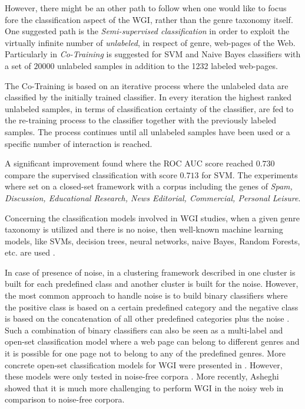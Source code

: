 However, there might be an other path to follow when one would like to focus fore the classification aspect of the WGI, rather than the genre taxonomy itself. One suggested path is the \textit{Semi-supervised classification} in order to exploit the virtually infinite number of \textit{unlabeled}, in respect of genre, web-pages of the Web. Particularly in \parencite{chetry2011web}\textit{ Co-Training} is suggested for SVM and Naive Bayes classifiers with a set of $20000$ unlabeled samples in addition to the 1232 labeled web-pages.

The Co-Training is based on an iterative process where the unlabeled data are classified by the initially trained classifier. In every iteration the highest ranked unlabeled samples, in terms of classification certainty of the classifier, are fed to the re-training process to the classifier together with the previously labeled samples. The process continues until all unlabeled samples have been used or a specific number of interaction is reached. 

A significant improvement found where the ROC AUC score reached $0.730$ compare the supervised classification with score $0.713$ for SVM. The experiments where set on a closed-set framework with a corpus including the genes of \textit{Spam, Discussion, Educational Research, News Editorial, Commercial, Personal Leisure}.

Concerning the classification models involved in WGI studies, when a given genre taxonomy is utilized and there is no noise, then well-known machine learning models, like SVMs, decision trees, neural networks, naive Bayes, Random Forests, etc. are used \parencite{Lim2005,santini2007automatic,kanaris2009learning,jebari2015combination,sharoff2010web}. 

In case of presence of  noise, in a clustering framework described in \parencite{kennedy2005automatic} one cluster is built for each predefined class and another cluster is built for the noise. However, the most  common approach to handle noise is to build binary classifiers where the positive class is based on a certain predefined category and the negative class is based on the concatenation of  all other predefined categories plus the noise \parencite{kennedy2005automatic,dong2006binary,levering2008using}. Such a combination of binary classifiers can also be seen as a multi-label and open-set classification model where a web page can belong to different genres and it is possible for one page not to belong to any of the predefined genres. More concrete open-set  classification models for WGI were presented in \parencite{stubbe2007genre,pritsos2013open}. However, these models were only tested in noise-free corpora \parencite{pritsos2015clef}. More  recently, Asheghi \parencite{Asheghi2015} showed that it is much more challenging to perform WGI in the noisy web in comparison to noise-free corpora.

